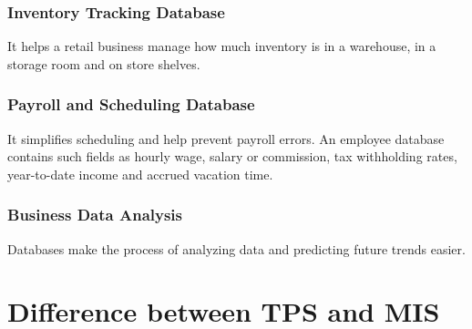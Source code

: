 \documentclass[twocolumn, 12pt, a4paper]{article}
\begin{document}
\subsubsection{Inventory Tracking Database}
It helps a retail business manage how much inventory is in a warehouse, in a storage room and on store shelves.

\subsubsection{Payroll and Scheduling Database}
It simplifies scheduling and help prevent payroll errors.
An employee database contains such fields as hourly wage, salary or commission, tax withholding rates, year-to-date income and accrued vacation time.

\subsubsection{Business Data Analysis}
Databases make the process of analyzing data and predicting future trends easier.




\onecolumn

\section{Difference between TPS and MIS}
\begin{table}[ht]
\end{table}
\end{document}
